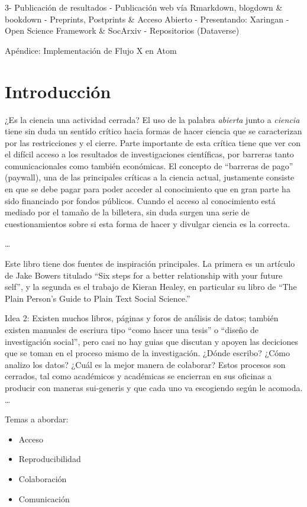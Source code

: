 \documentclass[11pt,]{book}
\providecommand{\tightlist}{%
  \setlength{\itemsep}{0pt}\setlength{\parskip}{0pt}}
\begin{document}
3- Publicación de resultados
- Publicación web vía Rmarkdown, blogdown \& bookdown
- Preprints, Postprints \& Acceso Abierto
- Presentando: Xaringan
- Open Science Framework \& SocArxiv
- Repositorios (Dataverse)

Apéndice: Implementación de Flujo X en Atom

\hypertarget{introducciuxf3n}{%
\chapter*{Introducción}\label{introducciuxf3n}}

¿Es la ciencia una actividad cerrada? El uso de la palabra \emph{abierta} junto a \emph{ciencia} tiene sin duda un sentido crítico hacia formas de hacer ciencia que se caracterizan por las restricciones y el cierre. Parte importante de esta crítica tiene que ver con el difícil acceso a los resultados de investigaciones científicas, por barreras tanto comunicacionales como también económicas. El concepto de ``barreras de pago'' (paywall), una de las principales críticas a la ciencia actual, justamente consiste en que se debe pagar para poder acceder al conocimiento que en gran parte ha sido financiado por fondos públicos. Cuando el acceso al conocimiento está mediado por el tamaño de la billetera, sin duda surgen una serie de cuestionamientos sobre si esta forma de hacer y divulgar ciencia es la correcta.

\ldots{}

Este libro tiene dos fuentes de inspiración principales. La primera es un artículo de Jake Bowers titulado ``Six steps for a better relationship with your future self'', y la segunda es el trabajo de Kieran Healey, en particular su libro de ``The Plain Person's Guide to Plain Text Social Science.'' \citep{Healy2018PlainPersonGuide}

Idea 2: Existen muchos libros, páginas y foros de análisis de datos; también existen manuales de escriura tipo ``como hacer una tesis'' o ``diseño de investigación social'', pero casi no hay guias que discutan y apoyen las deciciones que se toman en el proceso mismo de la investigación. ¿Dónde escribo? ¿Cómo analizo los datos? ¿Cuál es la mejor manera de colaborar? Estos procesos son cerrados, tal como académicos y académicas se encierran en sus oficinas a producir con maneras sui-generis y que cada uno va escogiendo según le acomoda. \ldots{}

Temas a abordar:

\begin{itemize}
\tightlist
\item
  Acceso
\item
  Reproducibilidad
\item
  Colaboración
\item
  Comunicación
\end{itemize}
\end{document}
